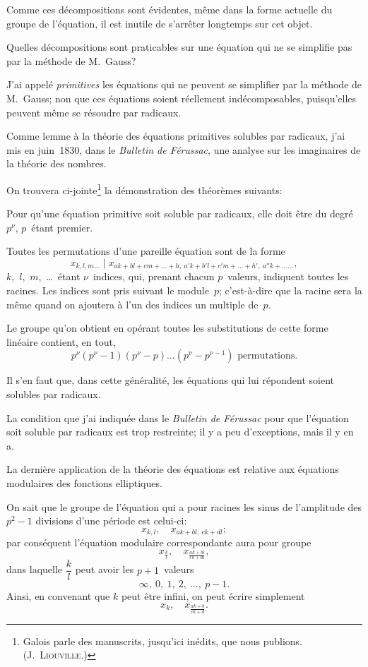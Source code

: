 \documentclass[leqno,12pt]{book}[2005/09/16]
\newcommand{\Title}[1]{\textit{#1}}
\newcommand{\Annot}[1]{%
  \null\hfill\nobreak\textsc{#1}\mbox{\quad}%
}
\newcommand{\efrac}[2]{\tfrac{#1}{#2}}
\let\Primo=\primo
\let\Secundo=\secundo
\renewcommand{\primo}{{\upshape\Primo}}
\renewcommand{\secundo}{{\upshape\Secundo}}
\begin{document}
Comme ces décompositions sont évidentes, même dans la forme
actuelle du groupe de l'équation, il est inutile de s'arrêter longtemps
sur cet objet.

Quelles décompositions sont praticables sur une équation qui
ne se simplifie pas par la méthode de M.~Gauss?

J'ai appelé \emph{primitives} les équations qui ne peuvent se simplifier
par la méthode de M.~Gauss; non que ces équations soient
réellement indécomposables, puisqu'elles peuvent même se
résoudre par radicaux.

Comme lemme à la théorie des équations primitives solubles
par radicaux, j'ai mis en juin~1830, dans le \Title{Bulletin de Férussac},
une analyse sur les imaginaires de la théorie des nombres.

On trouvera ci-jointe\footnote
  {Galois parle des manuscrits, jusqu'ici inédits, que nous publions. \\
  \Annot{(J.~Liouville.)}}
la démonstration des théorèmes suivants:

\primo Pour qu'une équation primitive soit soluble par radicaux,
elle doit être du degré~$p^{\nu}$, $p$~étant premier.

\secundo Toutes les permutations d'une pareille équation sont de la
forme
\[
x_{k, l, m\dots} \mid x_{ak+bl+cm+\dots+h,\: a'k+b'l+c'm+\dots+h',\: a''k+\dots\dots},
\]
$k$,~$l$,~$m$,~\dots\ étant $\nu$~indices, qui, prenant chacun $p$~valeurs, indiquent
toutes les racines. Les indices sont pris suivant le module~$p$;
c'est-à-dire que la racine sera la même quand on ajoutera à l'un
des indices un multiple de~$p$.

Le groupe qu'on obtient en opérant toutes les substitutions de
cette forme linéaire contient, en tout,
\[
p^{\nu} (p^{\nu} - 1) (p^{\nu} - p) \dots (p^{\nu} - p^{\nu-1}) \text{ permutations.}
\]

Il s'en faut que, dans cette généralité, les équations qui lui
répondent soient solubles par radicaux.

La condition que j'ai indiquée dans le \Title{Bulletin de Férussac}
pour que l'équation soit soluble par radicaux est trop restreinte;
il y a peu d'exceptions, mais il y en a.

La dernière application de la théorie des équations est relative
aux équations modulaires des fonctions elliptiques.

On sait que le groupe de l'équation qui a pour racines les sinus
de l'amplitude des $p^{2} - 1$ divisions d'une période est celui-ci:
\[
x_{k, l}, \quad x_{ak+bl,\: ck+dl};
\]
par conséquent l'équation modulaire correspondante aura pour
groupe
\[
x_{\efrac{k}{l}}, \quad x_{\efrac{ak+bl}{ck+dl}},
\]
dans laquelle $\dfrac{k}{l}$ peut avoir les $p + 1$~valeurs
\[
\infty,\ 0,\ 1,\ 2,\ \dots,\ p - 1.
\]
Ainsi, en convenant que $k$ peut être infini, on peut écrire simplement
\[
x_{k},\quad x_{\efrac{ak+b}{ck+d}}.
\]
\end{document}
